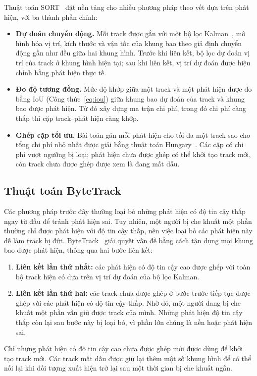 Thuật toán SORT~\cite{bewley2016sort} đặt nền tảng cho nhiều phương pháp theo vết dựa trên phát hiện, với ba thành phần chính:
\begin{itemize}
    \item \textbf{Dự đoán chuyển động.} Mỗi track được gắn với một bộ lọc Kalman~\cite{kalman1960}, mô hình hóa vị trí, kích thước và vận tốc của khung bao theo giả định chuyển động gần như đều giữa hai khung hình. Trước khi liên kết, bộ lọc dự đoán vị trí của track ở khung hình hiện tại; sau khi liên kết, vị trí dự đoán được hiệu chỉnh bằng phát hiện thực tế.
    \item \textbf{Đo độ tương đồng.} Mức độ khớp giữa một track và một phát hiện được đo bằng IoU (Công thức~\ref{eq:iou}) giữa khung bao dự đoán của track và khung bao được phát hiện. Từ đó xây dựng ma trận chi phí, trong đó chi phí càng thấp thì cặp track--phát hiện càng khớp.
    \item \textbf{Ghép cặp tối ưu.} Bài toán gán mỗi phát hiện cho tối đa một track sao cho tổng chi phí nhỏ nhất được giải bằng thuật toán Hungary~\cite{kuhn1955hungarian}. Các cặp có chi phí vượt ngưỡng bị loại; phát hiện chưa được ghép có thể khởi tạo track mới, còn track chưa được ghép được xem là đang mất dấu.
\end{itemize}

\subsection{Thuật toán ByteTrack}
\label{sec:3.3.3}

Các phương pháp trước đây thường loại bỏ những phát hiện có độ tin cậy thấp ngay từ đầu để tránh phát hiện sai. Tuy nhiên, một người bị che khuất một phần thường chỉ được phát hiện với độ tin cậy thấp, nên việc loại bỏ các phát hiện này dễ làm track bị đứt. ByteTrack~\cite{zhang2022bytetrack} giải quyết vấn đề bằng cách tận dụng mọi khung bao được phát hiện, thông qua hai bước liên kết:
\begin{enumerate}
    \item \textbf{Liên kết lần thứ nhất:} các phát hiện có độ tin cậy cao được ghép với toàn bộ track hiện có dựa trên vị trí dự đoán của bộ lọc Kalman.
    \item \textbf{Liên kết lần thứ hai:} các track chưa được ghép ở bước trước tiếp tục được ghép với các phát hiện có độ tin cậy thấp. Nhờ đó, một người đang bị che khuất một phần vẫn giữ được track của mình. Những phát hiện độ tin cậy thấp còn lại sau bước này bị loại bỏ, vì phần lớn chúng là nền hoặc phát hiện sai.
\end{enumerate}
Chỉ những phát hiện có độ tin cậy cao chưa được ghép mới được dùng để khởi tạo track mới. Các track mất dấu được giữ lại thêm một số khung hình để có thể nối lại khi đối tượng xuất hiện trở lại sau một thời gian bị che khuất ngắn.

